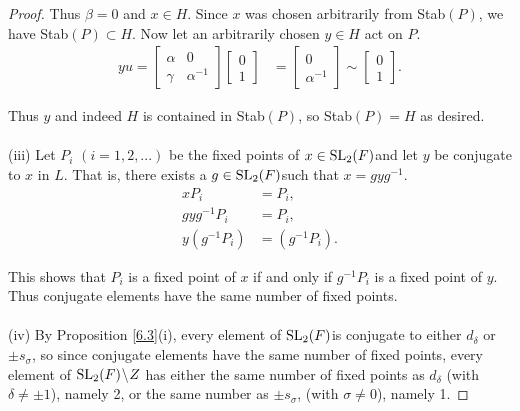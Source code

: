 \begin{proof}
Thus $\beta = 0$ and $x \in H$. Since $x$ was chosen arbitrarily from Stab$(P)$, we have Stab$(P) \subset H$. Now let an arbitrarily chosen $y \in H$ act on $P$. \\
\begin{align*} y u = \begin{bmatrix} \alpha & 0 \\ \gamma & \alpha^{-1} \end{bmatrix} \begin{bmatrix} 0 \\ 1 \end{bmatrix} &= \begin{bmatrix} 0 \\ \alpha^{-1} \end{bmatrix} \sim \begin{bmatrix} 0 \\ 1 \end{bmatrix}.
\end{align*}

Thus $y$ and indeed $H$ is contained in Stab$(P)$, so Stab$(P) = H$ as desired. \\
\\
(iii) Let $P_i$ $(i = 1,2,...)$ be the fixed points of $x\in \operatorname{SL}_2(F)$and let $y$ be conjugate to $x$ in $L$. That is, there exists a $g \in \operatorname{SL}_2(F)$such that $x = gyg^{-1}$.
\begin{align*} x P_i &= P_i,
\\ gyg^{-1} P_i &= P_i,
\\ y(g^{-1} P_i) &= (g^{-1} P_i).
\end{align*}

This shows that $P_i$ is a fixed point of $x$ if and only if $g^{-1} P_i$ is a fixed point of $y$. Thus conjugate elements have the same number of fixed points. \\
\\
(iv) By Proposition \ref{6.3}(i), every  element of $\operatorname{SL}_2(F)$is conjugate to either $d_\delta$ or $\pm s_\sigma$, so since conjugate elements have the same number of fixed points, every element of $\operatorname{SL}_2(F)\! \setminus \! Z$ has either the same number of fixed points as $d_\delta$ (with $\delta \neq \pm 1$), namely 2, or the same number as $\pm s_\sigma$, (with $\sigma \neq 0$), namely 1.

\end{proof}


